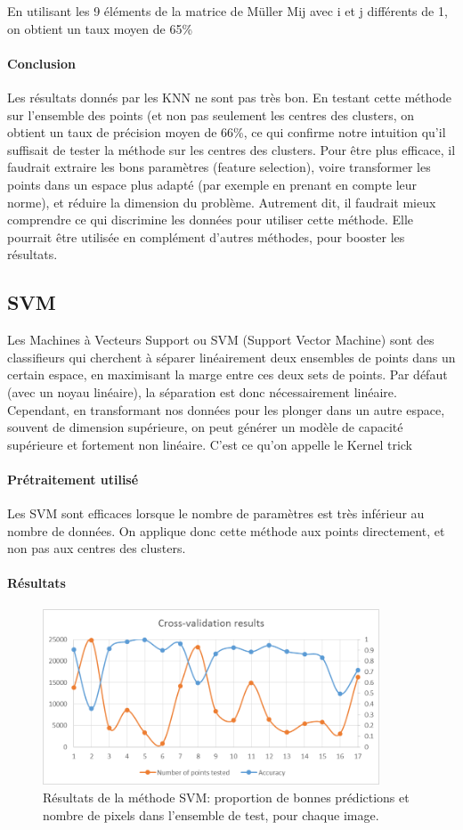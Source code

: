 \documentclass[a4paper,10pt]{report}
\begin{document}
En utilisant les 9 éléments de la matrice de Müller Mij avec i et j différents de 1, on obtient un taux moyen de 65\%
\paragraph{Conclusion}
Les résultats donnés par les KNN ne sont pas très bon. En testant cette méthode sur l’ensemble des points (et non pas seulement les centres des clusters, on obtient un taux de précision moyen de 66\%, ce qui confirme notre intuition qu’il suffisait de tester la méthode sur les centres des clusters.
Pour être plus efficace, il faudrait extraire les bons paramètres (feature selection), voire transformer les points dans un espace plus adapté (par exemple en prenant en compte leur norme), et réduire la dimension du problème. Autrement dit, il faudrait mieux comprendre ce qui discrimine les données pour utiliser cette méthode. Elle pourrait être utilisée en complément d’autres méthodes, pour booster les résultats.

\subsection{SVM}
Les Machines à Vecteurs Support ou SVM (Support Vector Machine) sont des classifieurs qui cherchent à séparer linéairement deux ensembles de points dans un certain espace, en maximisant la marge entre ces deux sets de points. Par défaut (avec un noyau linéaire), la séparation est donc nécessairement linéaire. Cependant, en transformant nos données pour les plonger dans un autre espace, souvent de dimension supérieure, on peut générer un modèle de capacité supérieure et fortement non linéaire. C'est ce qu'on appelle le Kernel trick

\paragraph{Prétraitement utilisé}
Les SVM sont efficaces lorsque le nombre de paramètres est très inférieur au nombre de données. On applique donc cette méthode aux points directement, et non pas aux centres des clusters.

\paragraph{Résultats}

\begin{figure}[H]
  \centering  
  \caption{Résultats de la méthode SVM: proportion de bonnes prédictions et nombre de pixels dans l'ensemble de test, pour chaque image.}
  \includegraphics[width=10cm]{SVM_CV.png}
\end{figure}
\end{document}
